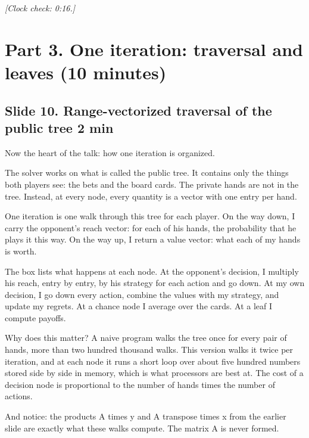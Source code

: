 \documentclass[11pt]{article}
\newcommand{\slidehead}[3]{\subsection*{Slide #1. #2 \hfill {\normalfont\small #3}}}
\newcommand{\cue}[1]{{\small\itshape\color{black!65}[#1]}}
\begin{document}
\cue{Clock check: 0:16.}

\section{Part 3. One iteration: traversal and leaves (10 minutes)}

\slidehead{10}{Range-vectorized traversal of the public tree}{2 min}
\begin{say}
Now the heart of the talk: how one iteration is organized.

The solver works on what is called the public tree. It contains only the things both players see: the bets and the
board cards. The private hands are not in the tree. Instead, at every node, every quantity is a vector with one
entry per hand.

One iteration is one walk through this tree for each player. On the way down, I carry the opponent's reach vector:
for each of his hands, the probability that he plays it this way. On the way up, I return a value vector: what each
of my hands is worth.

The box lists what happens at each node. At the opponent's decision, I multiply his reach, entry by entry, by his
strategy for each action and go down. At my own decision, I go down every action, combine the values with my
strategy, and update my regrets. At a chance node I average over the cards. At a leaf I compute payoffs.

Why does this matter? A naive program walks the tree once for every pair of hands, more than two hundred thousand
walks. This version walks it twice per iteration, and at each node it runs a short loop over about five hundred
numbers stored side by side in memory, which is what processors are best at. The cost of a decision node is
proportional to the number of hands times the number of actions.

And notice: the products A times y and A transpose times x from the earlier slide are exactly what these walks
compute. The matrix A is never formed.
\end{say}
\end{document}
